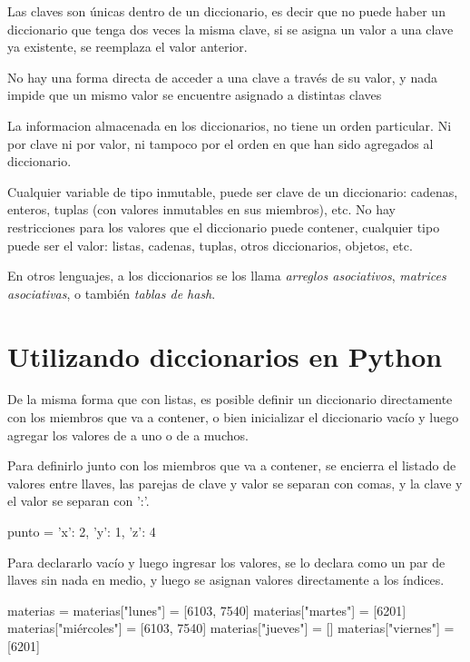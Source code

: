 
Las claves son únicas dentro de un diccionario, es decir que no puede haber
un diccionario que tenga dos veces la misma clave, si se asigna un valor a
una clave ya existente, se reemplaza el valor anterior.

No hay una forma directa de acceder a una clave a través de su valor, y
nada impide que un mismo valor se encuentre asignado a distintas claves

La informacion almacenada en los diccionarios, no tiene un orden
particular.  Ni por clave ni por valor, ni tampoco por el orden en
que han sido agregados al diccionario.

Cualquier variable de tipo inmutable, puede ser clave de un diccionario:
cadenas, enteros, tuplas (con valores inmutables en sus miembros), etc.  No hay
restricciones para los valores que el diccionario puede contener, cualquier
tipo puede ser el valor: listas, cadenas, tuplas, otros diccionarios, objetos,
etc.

\begin{sabias_que}
En otros lenguajes, a los diccionarios se los llama {\it arreglos
asociativos}, {\it matrices asociativas}, o también {\it tablas de hash}.
\end{sabias_que}

\section{Utilizando diccionarios en Python}

De la misma forma que con listas, es posible definir un diccionario
directamente con los miembros que va a contener, o bien inicializar el
diccionario vacío y luego agregar los valores de a uno o de a muchos.

Para definirlo junto con los miembros que va a contener, se encierra el
listado de valores entre llaves, las parejas de clave y valor se separan
con comas, y la clave y el valor se separan con ':'.

\begin{codigo-python-sn}
punto = {'x': 2, 'y': 1, 'z': 4}
\end{codigo-python-sn}

Para declararlo vacío y luego ingresar los valores, se lo declara como un
par de llaves sin nada en medio, y luego se asignan valores directamente a
los índices.

\begin{codigo-python-sn}
materias = {}
materias["lunes"] = [6103, 7540]
materias["martes"] = [6201]
materias["miércoles"] = [6103, 7540]
materias["jueves"] = []
materias["viernes"] = [6201]
\end{codigo-python-sn}

